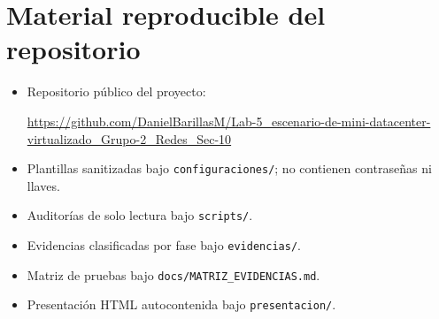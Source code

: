 \documentclass[11pt,a4paper]{article}
\begin{document}
\appendix
\section{Material reproducible del repositorio}

\begin{itemize}
  \item Repositorio público del proyecto:
  \begin{sloppypar}
    \small\url{https://github.com/DanielBarillasM/Lab-5_escenario-de-mini-datacenter-virtualizado_Grupo-2_Redes_Sec-10}
  \end{sloppypar}
  \item Plantillas sanitizadas bajo \texttt{configuraciones/}; no contienen contraseñas ni llaves.
  \item Auditorías de solo lectura bajo \texttt{scripts/}.
  \item Evidencias clasificadas por fase bajo \texttt{evidencias/}.
  \item Matriz de pruebas bajo \texttt{docs/MATRIZ\_EVIDENCIAS.md}.
  \item Presentación HTML autocontenida bajo \texttt{presentacion/}.
\end{itemize}
\end{document}
